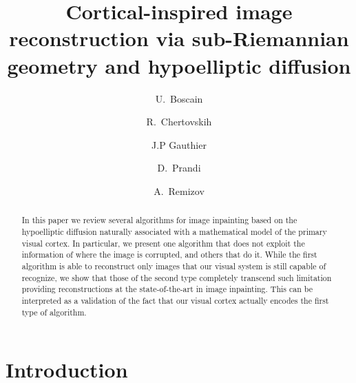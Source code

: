 \documentclass[proc]{edpsmath}
\title{Cortical-inspired image reconstruction via sub-Riemannian geometry and hypoelliptic diffusion}
\begin{document}
\author{U.\ Boscain}
  \address{CNRS, LJLL, Universit\'e Pierre et Marie Curie, Paris, France}
\author{R.\ Chertovskih}
  \address{SYSTEC, FEUP, University of Porto, Portugal}
\author{J.P Gauthier}
  \address{LSIS, Universit\'e de Toulon, France}
\author{D.\ Prandi}
  \address{CRNS, L2S, CentraleSup\'elec, Gif-sur-Yvette, France}
\author{A.\ Remizov}
  \address{CMAP, \'Ecole Polytechnique, Palaiseau, France}

\begin{abstract}
   In this paper we review several algorithms for image inpainting based on the hypoelliptic diffusion naturally associated with a mathematical model of the primary visual cortex. In particular, we present one algorithm that does not exploit the information of where the image is corrupted, and others that do it. While the first algorithm is able to reconstruct only images that our visual system is still capable of recognize, we show that those of the second type completely transcend such limitation providing reconstructions at the state-of-the-art in image inpainting. This can be interpreted as a validation of the fact that our visual cortex actually encodes the first type of algorithm.
\end{abstract}



\maketitle





\section{Introduction}
\end{document}
